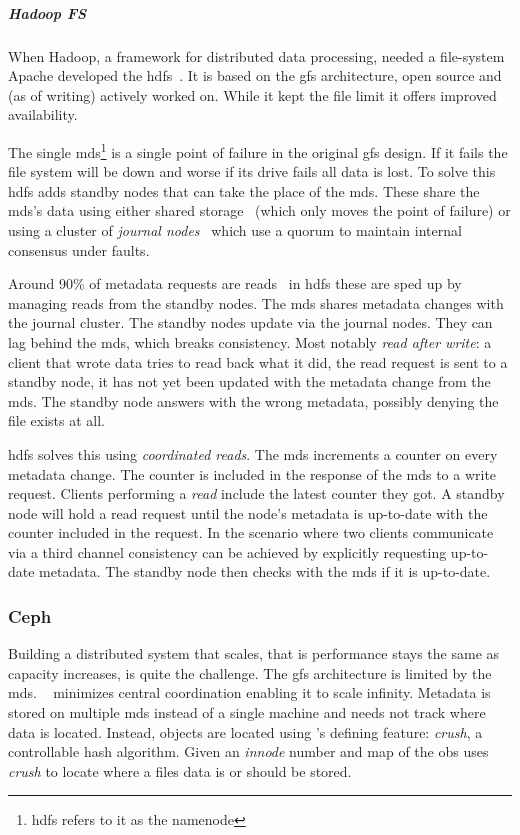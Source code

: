 \subparagraph*{Hadoop FS} \label{sec:hdfs}
When Hadoop, a framework for distributed data processing, needed a file-system Apache developed the \ac{hdfs}~\cite{hdfs}. It is based on the \ac{gfs} architecture, open source and (as of writing) actively worked on. While it kept the file limit it offers improved availability.

The single \ac{mds}\footnote{\ac{hdfs} refers to it as the namenode} is a single point of failure in the original \ac{gfs} design. If it fails the file system will be down and worse if its drive fails all data is lost. To solve this \ac{hdfs} adds standby nodes that can take the place of the \ac{mds}. These share the \ac{mds}'s data using either shared storage~\cite{hdfs_ha_nfs} (which only moves the point of failure) or using a cluster of \textit{journal nodes}~\cite{hdfs_ha_q} which use a quorum to maintain internal consensus under faults. 

Around 90\% of metadata requests are reads~\cite{hdfs_ha_reads} in \ac{hdfs} these are sped up by managing reads from the standby nodes. The \ac{mds} shares metadata changes with the journal cluster. The standby nodes update via the journal nodes. They can lag behind the \ac{mds}, which breaks consistency. Most notably \textit{read after write}: a client that wrote data tries to read back what it did, the read request is sent to a standby node, it has not yet been updated with the metadata change from the \ac{mds}. The standby node answers with the wrong metadata, possibly denying the file exists at all. 

\ac{hdfs} solves this using \textit{coordinated reads}. The \ac{mds} increments a counter on every metadata change. The counter is included in the response of the \ac{mds} to a write request. Clients performing a \textit{read} include the latest counter they got. A standby node will hold a read request until the node's metadata is up-to-date with the counter included in the request. In the scenario where two clients communicate via a third channel consistency can be achieved by explicitly requesting up-to-date metadata. The standby node then checks with the \ac{mds} if it is up-to-date.

\subsubsection*{Ceph} \label{sec:ceph}
Building a distributed system that scales, that is performance stays the same as capacity increases, is quite the challenge. The \ac{gfs} architecture is limited by the \acf{mds}. \ceph{}~\cite{ceph} minimizes central coordination enabling it to scale infinity. Metadata is stored on multiple \ac{mds} instead of a single machine and needs not track where data is located. Instead, objects are located using \ceph{}'s defining feature: \emph{\ac{crush}}, a controllable hash algorithm. Given an \textit{innode} number and map of the \ac{obs} \ceph{} uses \emph{\ac{crush}} to locate where a files data is or should be stored. 

